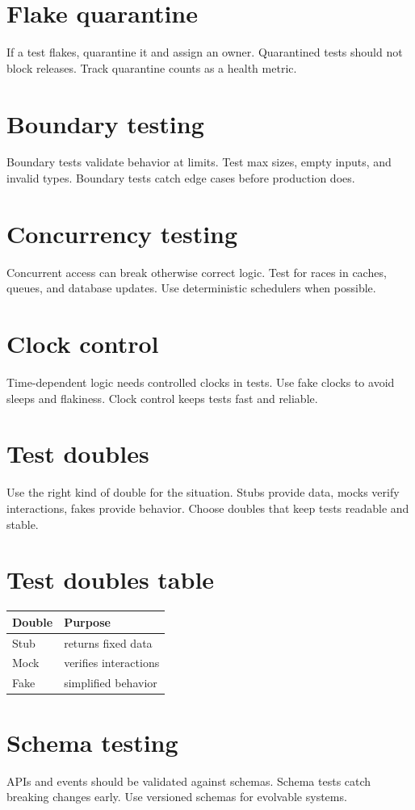\section{Flake quarantine}
If a test flakes, quarantine it and assign an owner.
Quarantined tests should not block releases.
Track quarantine counts as a health metric.

\section{Boundary testing}
Boundary tests validate behavior at limits.
Test max sizes, empty inputs, and invalid types.
Boundary tests catch edge cases before production does.

\section{Concurrency testing}
Concurrent access can break otherwise correct logic.
Test for races in caches, queues, and database updates.
Use deterministic schedulers when possible.

\section{Clock control}
Time-dependent logic needs controlled clocks in tests.
Use fake clocks to avoid sleeps and flakiness.
Clock control keeps tests fast and reliable.

\section{Test doubles}
Use the right kind of double for the situation.
Stubs provide data, mocks verify interactions, fakes provide behavior.
Choose doubles that keep tests readable and stable.

\section{Test doubles table}
\begin{tabularx}{\textwidth}{@{}lX@{}}
\toprule
Double & Purpose \\
\midrule
Stub & returns fixed data \\
Mock & verifies interactions \\
Fake & simplified behavior \\
\bottomrule
\end{tabularx}

\section{Schema testing}
APIs and events should be validated against schemas.
Schema tests catch breaking changes early.
Use versioned schemas for evolvable systems.

